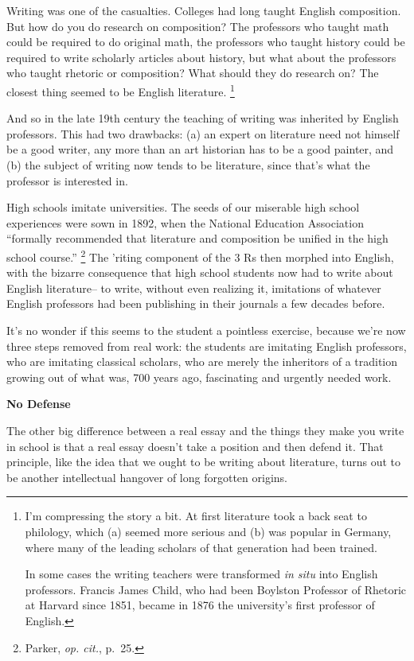 \documentclass[12pt]{book}
\begin{document}
Writing was one of the casualties. Colleges had long taught English
composition. But how do you do research on composition? The professors
who taught math could be required to do original math, the professors
who taught history could be required to write scholarly articles about
history, but what about the professors who taught rhetoric or
composition? What should they do research on? The closest thing seemed
to be English literature. \footnote{I'm compressing the story a bit. At first literature took a back
seat to philology, which (a) seemed more serious and (b) was popular in
Germany, where many of the leading scholars of that generation had been
trained.

In some cases the writing teachers were transformed \emph{in situ} into
English professors. Francis James Child, who had been Boylston Professor
of Rhetoric at Harvard since 1851, became in 1876 the university's first
professor of English.}

And so in the late 19th century the teaching of writing was inherited by
English professors. This had two drawbacks: (a) an expert on literature
need not himself be a good writer, any more than an art historian has to
be a good painter, and (b) the subject of writing now tends to be
literature, since that's what the professor is interested in.

High schools imitate universities. The seeds of our miserable high
school experiences were sown in 1892, when the National Education
Association ``formally recommended that literature and composition be
unified in the high school course.'' \footnote{Parker, \emph{op. cit.}, p.~25.} The 'riting component of
the 3 Rs then morphed into English, with the bizarre consequence that
high school students now had to write about English literature-- to
write, without even realizing it, imitations of whatever English
professors had been publishing in their journals a few decades before.

It's no wonder if this seems to the student a pointless exercise,
because we're now three steps removed from real work: the students are
imitating English professors, who are imitating classical scholars, who
are merely the inheritors of a tradition growing out of what was, 700
years ago, fascinating and urgently needed work.

\textbf{No Defense}

The other big difference between a real essay and the things they make
you write in school is that a real essay doesn't take a position and
then defend it. That principle, like the idea that we ought to be
writing about literature, turns out to be another intellectual hangover
of long forgotten origins.
\end{document}
